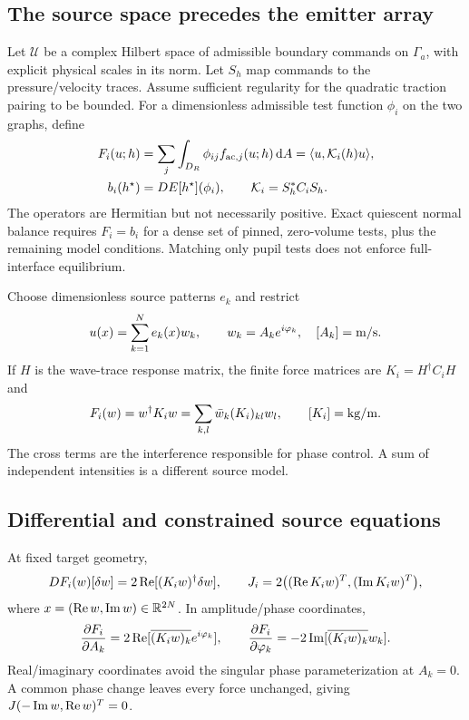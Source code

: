 \subsection{The source space precedes the emitter array}
Let $\mathcal U$ be a complex Hilbert space of admissible boundary commands
on $\Gamma_a$, with explicit physical scales in its norm. Let $S_h$ map
commands to the pressure/velocity traces. Assume sufficient regularity for
the quadratic traction pairing to be bounded. For a dimensionless admissible
test function $\phi_i$ on the two graphs, define
\begin{align}
 F_i(u;h)&=\sum_j\int_{D_R}\phi_{ij}f_{{\rm ac},j}(u;h)\,\mathrm d A
 =\langle u,\mathcal K_i(h)u\rangle,\label{eq:continuous-quadratic}\\
 b_i(h^\star)&=DE[h^\star](\phi_i),\qquad
 \mathcal K_i=S_h^*C_iS_h.\label{eq:continuous-target}
\end{align}
The operators are Hermitian but not necessarily positive. Exact quiescent
normal balance requires $F_i=b_i$ for a dense set of pinned, zero-volume
tests, plus the remaining model conditions. Matching only pupil tests does
not enforce full-interface equilibrium.

Choose dimensionless source patterns $e_k$ and restrict
\begin{equation}\label{eq:source-expansion}
 u(x)=\sum_{k=1}^Ne_k(x)w_k,\qquad
 w_k=A_ke^{i\varphi_k},\quad [A_k]={\rm m/s}.
\end{equation}
If $H$ is the wave-trace response matrix, the finite force matrices are
$K_i=H^\dagger C_iH$ and
\begin{equation}\label{eq:finite-force}
 F_i(w)=w^\dagger K_iw
 =\sum_{k,l}\bar w_k(K_i)_{kl}w_l,\qquad [K_i]={\rm kg/m}.
\end{equation}
The cross terms are the interference responsible for phase control. A sum
of independent intensities is a different source model.

\subsection{Differential and constrained source equations}
At fixed target geometry,
\begin{equation}\label{eq:force-jacobian}
 DF_i(w)[\delta w]=2\operatorname{Re}[(K_iw)^\dagger\delta w],\qquad
 J_i=2\big((\operatorname{Re} K_iw)^T,(\operatorname{Im} K_iw)^T\big),
\end{equation}
where $x=(\operatorname{Re} w,\operatorname{Im} w)\in\mathbb R^{2N}$. In amplitude/phase coordinates,
\begin{equation}\label{eq:amplitude-phase-grad}
 \frac{\partial F_i}{\partial A_k}=2\operatorname{Re}[\overline{(K_iw)_k}e^{i\varphi_k}],
 \qquad
 \frac{\partial F_i}{\partial\varphi_k}=-2\operatorname{Im}[\overline{(K_iw)_k}w_k].
\end{equation}
Real/imaginary coordinates avoid the singular phase parameterization at
$A_k=0$. A common phase change leaves every force unchanged, giving
$J(-\operatorname{Im} w,\operatorname{Re} w)^T=0$.

